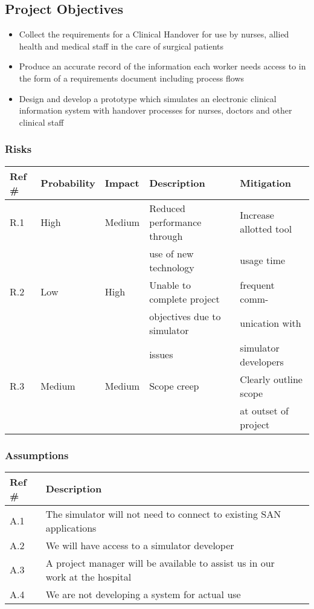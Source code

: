\newpage
\subsection{Project Objectives}
\label{Project Objectives}
\begin{itemize}
\item Collect the requirements for a Clinical Handover for use by nurses, allied health and medical staff in the care of surgical patients
\item Produce an accurate record of the information each worker needs access to in the form of a requirements document including process flows
\item Design and develop a prototype which simulates an electronic clinical information system with handover processes for nurses, doctors and other clinical staff
\end{itemize}

\subsubsection{Risks}

\begin{tabular}{|l|l|l|l|l|}
\hline
{\bf Ref \#} & {\bf Probability} & {\bf Impact} & {\bf Description} & {\bf Mitigation} \\
\hline
R.1 & High & Medium & Reduced performance through & Increase allotted tool  \\ & & & use of new technology & usage time  \\ 
\hline
R.2 & Low & High & Unable to complete project  & frequent comm- \\ & & & objectives due to simulator & unication with \\ & & & issues & simulator developers  \\  
\hline
R.3 & Medium & Medium & Scope creep & Clearly outline scope \\ & & & &  at outset of project \\
\hline
\end{tabular}

\subsubsection{Assumptions}

\begin{tabular}{|l|l|l|}
\hline
{\bf Ref \#} & {\bf Description} \\
\hline
A.1 & The simulator will not need to connect to existing SAN applications \\
\hline
A.2 & We will have access to a simulator developer \\
\hline
A.3 & A project manager will be available to assist us in our work at the hospital \\ 
\hline
A.4 & We are not developing a system for actual use \\
\hline
\end{tabular}

